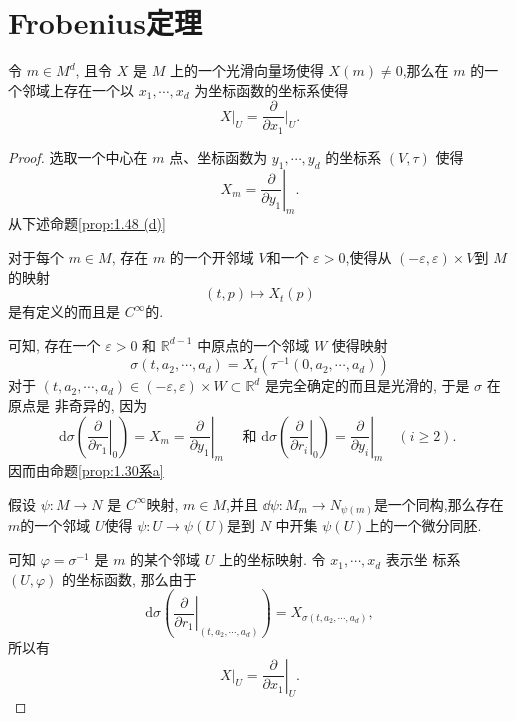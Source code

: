 \section{Frobenius定理}\label{thm:frobenius 1 denmension}
\begin{thm}
    令 $m\in M^d$, 且令 $X$ 是 $M$ 上的一个光滑向量场使得 $X(m)\neq 0$,那么在 $m$ 的一个邻域上存在一个以 $x_1,\cdots,x_d$ 为坐标函数的坐标系使得
    \begin{equation}
        X\big|_U =\frac{\partial}{\partial x_1}\bigg|_U.
    \end{equation}
\end{thm}
\begin{proof}
    选取一个中心在 $m$ 点、坐标函数为 $y_1, \cdots, y_d$ 的坐标系 $(V, \tau)$ 使得
\begin{equation}\label{eq:1.5}
X_m=\left.\frac{\partial}{\partial y_1}\right|_m .
\end{equation}
从下述命题\ref{prop:1.48 (d)}
\begin{prop}\label{prop:1.48 (d)}
    对于每个 $m\in M$, 存在 $m$ 的一个开邻域 $V$和一个 $\varepsilon>0$,使得从 $(-\varepsilon,\varepsilon)\times V$到 $M$的映射
    \begin{equation}
        (t,p)\mapsto X_t (p)
    \end{equation}
    是有定义的而且是 $C^\infty$的.
\end{prop}
可知, 存在一个 $\varepsilon>0$ 和 $\mathbb{R}^{d-1}$ 中原点的一个邻域 $W$ 使得映射
$$
\sigma\left(t, a_2, \cdots, a_d\right)=X_t\left(\tau^{-1}\left(0, a_2, \cdots, a_d\right)\right)
$$
对于 $\left(t, a_2, \cdots, a_d\right) \in(-\varepsilon, \varepsilon) \times W \subset \mathbb{R}^d$ 是完全确定的而且是光滑的, 于是 $\sigma$ 在原点是 非奇异的, 因为
$$
\mathrm{d} \sigma\left(\left.\frac{\partial}{\partial r_1}\right|_0\right)=X_m=\left.\frac{\partial}{\partial y_1}\right|_m \quad \text { 和 } \mathrm{d} \sigma\left(\left.\frac{\partial}{\partial r_i}\right|_0\right)=\left.\frac{\partial}{\partial y_i}\right|_m \quad(i \geqslant 2) \text {. }
$$
因而由命题\ref{prop:1.30系a}
\begin{prop}\label{prop:1.30系a}
    假设 $\psi\colon M\to N$ 是 $C^\infty$映射, $m\in M$,并且 $\dd \psi\colon M_m\to N_{\psi(m)}$是一个同构,那么存在 $m$的一个邻域 $U$使得 $\psi\colon U\to \psi(U)$是到 $N$ 中开集 $\psi(U)$上的一个微分同胚.
\end{prop}
可知 $\varphi=\sigma^{-1}$ 是 $m$ 的某个邻域 $U$ 上的坐标映射. 令 $x_1, \cdots, x_d$ 表示坐 标系 $(U, \varphi)$ 的坐标函数, 那么由于
$$
\mathrm{d} \sigma\left(\left.\frac{\partial}{\partial r_1}\right|_{\left(t, a_2, \cdots, a_d\right)}\right)=X_{\sigma\left(t, a_2, \cdots, a_d\right)},
$$
所以有
$$
\left.X\right|_U=\left.\frac{\partial}{\partial x_1}\right|_U .
$$
\end{proof}
